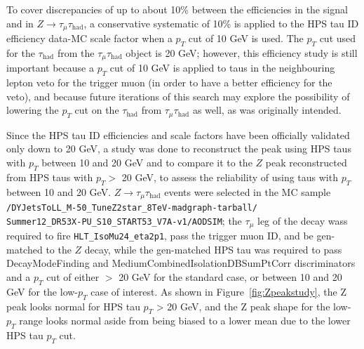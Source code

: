 To cover discrepancies of up to about 10\% between the efficiencies in the signal and in $Z\rightarrow\tau_{\mu}\tau_{\text{had}}$, a conservative systematic of 10\% is applied to the HPS tau ID efficiency data-MC scale factor when a $p_T$ cut of 10 GeV is used. The $p_T$ cut used for the $\tau_{\text{had}}$ from the $\tau_{\mu}\tau_{\text{had}}$ object is 20 GeV; however, this efficiency study is still important because a $p_T$ cut of 10 GeV is applied to taus in the neighbouring lepton veto for the trigger muon (in order to have a better efficiency for the veto), and because future iterations of this search may explore the possibility of lowering the $p_T$ cut on the $\tau_{\text{had}}$ from $\tau_{\mu}\tau_{\text{had}}$ as well, as was originally intended.

Since the HPS tau ID efficiencies and scale factors have been officially validated only down to 20 GeV, a study was done to reconstruct the \Z peak using HPS taus with $p_T$ between 10 and 20 GeV and to compare it to the $Z$ peak reconstructed from HPS taus with $p_T >$ 20 GeV, to assess the reliability of using taus with $p_T$ between 10 and 20 GeV. $Z\rightarrow\tau_{\mu}\tau_{\text{had}}$ events were selected in the MC sample \texttt{/DYJetsToLL\_M-50\_TuneZ2star\_8TeV-madgraph-tarball/\\Summer12\_DR53X-PU\_S10\_START53\_V7A-v1/AODSIM}; the $\tau_{\mu}$ leg of the \Z decay wass required to fire \texttt{HLT\_IsoMu24\_eta2p1}, pass the trigger muon ID, and be gen-matched to the $Z$ decay, while the gen-matched HPS tau was required to pass DecayModeFinding and MediumCombinedIsolationDBSumPtCorr discriminators and a $p_T$ cut of either $>$ 20 GeV for the standard case, or between 10 and 20 GeV for the low-$p_T$ case of interest. As shown in Figure~\ref{fig:Zpeakstudy}, the Z peak looks normal for HPS tau $p_T$ \textgreater\xspace 20 GeV, and the Z peak shape for the low-$p_T$ range looks normal aside from being biased to a lower mean due to the lower HPS tau $p_T$ cut.

